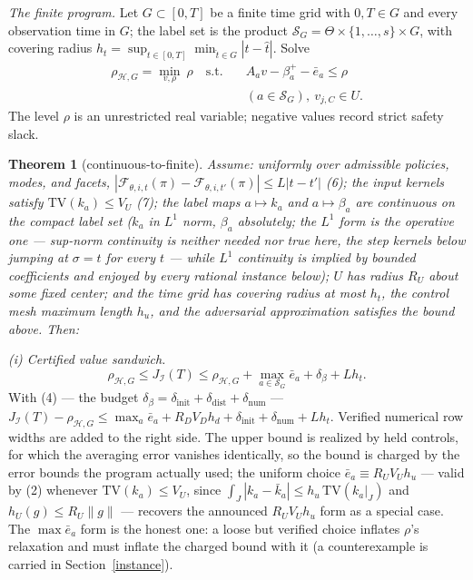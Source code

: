 \documentclass[10pt,twocolumn]{article}
\theoremstyle{plain}
\newtheorem{theorem}{Theorem}
\theoremstyle{definition}
\theoremstyle{remark}
\begin{document}
\emph{The finite program.} Let \(G \subset [0,T]\) be a finite time grid with \(0, T \in G\) and
every observation time in \(G\); the label set is the product
\(\mathscr{S}_G = \Theta \times \{1,\dots,s\} \times G\), with covering
radius \(h_t = \sup_{t \in [0,T]} \min_{\hat{t} \in G} |t -
\hat{t}|\). Solve
\begin{align*}
\rho_{\mathcal{H},G} = \min_{v, \rho}\ \rho
\quad \text{s.t.} \quad
& A_a v - \beta_a^{+} - \bar{e}_a \le \rho \\
& (a \in \mathscr{S}_G),
\ v_{j,C} \in U.
\tag{5}
\end{align*}
The level \(\rho\) is an unrestricted real variable; negative values record
strict safety slack.

\begin{theorem}[continuous-to-finite]\label{thm:bridge}
Assume: uniformly over admissible policies, modes, and facets,
\(|\mathcal{F}_{\theta,i,t}(\pi) - \mathcal{F}_{\theta,i,t'}(\pi)| \le
L|t - t'|\) (6); the input kernels satisfy \(\mathrm{TV}(k_a) \le V_U\) (7); the label
maps \(a \mapsto k_a\) and \(a \mapsto \beta_a\) are continuous on
the compact label set (\(k_a\) in \(L^1\) norm, \(\beta_a\)
absolutely; the \(L^1\) form is the operative one --- sup-norm continuity
is neither needed nor true here, the step kernels below jumping at
\(\sigma = t\) for every \(t\) --- while \(L^1\) continuity is implied
by bounded coefficients and enjoyed by every rational instance below);
\(U\) has radius \(R_U\) about some fixed center; and the time grid has
covering radius at most \(h_t\), the control mesh maximum length \(h_u\),
and the adversarial approximation satisfies the bound above. Then:
\end{theorem}

\noindent\emph{(i) Certified value sandwich.}
\[
\rho_{\mathcal{H},G} \le J_{\mathcal{I}}(T) \le \rho_{\mathcal{H},G}
+ \max_{a \in \mathscr{S}_G} \bar{e}_a + \delta_\beta + L h_t.
\tag{8}
\]
With (4) --- the budget \(\delta_\beta = \delta_{\mathrm{init}} +
\delta_{\mathrm{dist}} + \delta_{\mathrm{num}}\) --- \(J_{\mathcal{I}}(T) -
\rho_{\mathcal{H},G} \le \max_{a} \bar{e}_a + R_D
V_D h_d + \delta_{\mathrm{init}} + \delta_{\mathrm{num}} + L h_t\).
Verified numerical row widths are added to the right side. The upper bound
is realized by held controls, for which the averaging error vanishes
identically, so the bound is charged by the error bounds the program
actually used; the uniform choice \(\bar{e}_a \equiv R_U V_U h_u\) ---
valid by (2) whenever \(\mathrm{TV}(k_a) \le V_U\), since
\(\int_J |k_a - \bar{k}_a| \le h_u\, \mathrm{TV}(k_a|_J)\) and
\(h_U(g) \le R_U \|g\|\) --- recovers the announced
\(R_U V_U h_u\) form as a special case. The \(\max \bar{e}_a\) form is
the honest one: a loose but verified choice inflates \(\rho\)'s relaxation
and must inflate the charged bound with it (a counterexample is carried in
Section~\ref{instance}).
\end{document}
